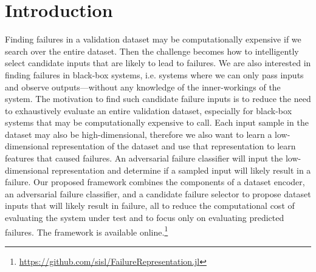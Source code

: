 \section{Introduction}
Finding failures in a validation dataset may be computationally expensive if we search over the entire dataset.
Then the challenge becomes how to intelligently select candidate inputs that are likely to lead to failures.
We are also interested in finding failures in black-box systems, i.e. systems where we can only pass inputs and observe outputs---without any knowledge of the inner-workings of the system.
The motivation to find such candidate failure inputs is to reduce the need to exhaustively evaluate an entire validation dataset, especially for black-box systems that may be computationally expensive to call.
Each input sample in the dataset may also be high-dimensional, therefore we also want to learn a low-dimensional representation of the dataset and use that representation to learn features that caused failures.
An adversarial failure classifier will input the low-dimensional representation and determine if a sampled input will likely result in a failure.
Our proposed framework combines the components of a dataset encoder, an adversarial failure classifier, and a candidate failure selector to propose dataset inputs that will likely result in failure, all to reduce the computational cost of evaluating the system under test and to focus only on evaluating predicted failures.
The framework is available online.\footnote{\url{https://github.com/sisl/FailureRepresentation.jl}}

